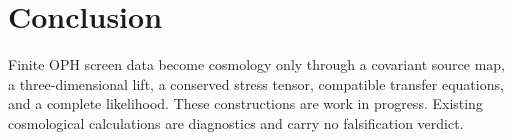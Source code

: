 \documentclass[11pt]{article}
\begin{document}
\section{Conclusion}

Finite OPH screen data become cosmology only through a covariant source map,
a three-dimensional lift, a conserved stress tensor, compatible transfer
equations, and a complete likelihood. These constructions are work in progress.
Existing cosmological calculations are diagnostics and carry no falsification
verdict.
\end{document}
